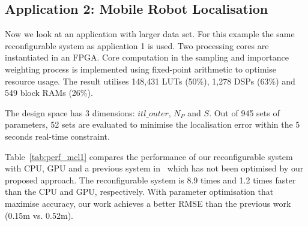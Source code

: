 \subsection{Application 2: Mobile Robot Localisation}

Now we look at an application with larger data set.
For this example the same reconfigurable system as application 1 is used. 
Two processing cores are instantiated in an FPGA.
Core computation in the sampling and importance weighting process is implemented using fixed-point arithmetic to optimise resource usage.
The result utilises 148,431 LUTs (50\%), 1,278 DSPs (63\%) and 549 block RAMs (26\%).

The design space has 3 dimensions: $itl\_outer$, $N_P$ and $S$.
Out of 945 sets of parameters, 52 sets are evaluated to minimise the localisation error within the 5 seconds real-time constraint.

Table~\ref{tab:perf_mcl1} compares the performance of our reconfigurable system with CPU, GPU and a previous system in~\cite{chau13a} 
which has not been optimised by our proposed approach.
The reconfigurable system is 8.9 times and 1.2 times faster than the CPU and GPU, respectively.
With parameter optimisation that maximise accuracy, our work achieves a better RMSE than the previous work (0.15m vs. 0.52m).

